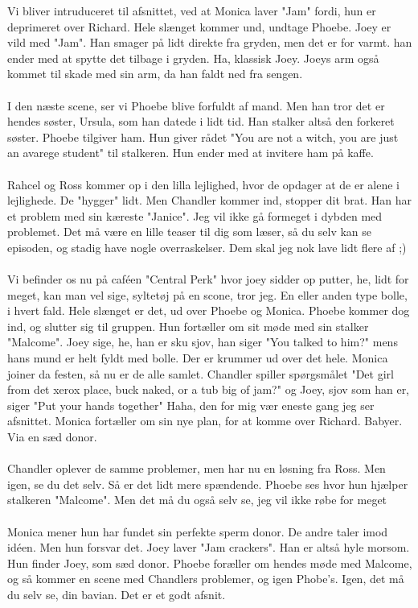 \documentclass[]{article}
\begin{document}
Vi bliver intruduceret til afsnittet, ved at Monica laver "Jam" fordi, hun er deprimeret over Richard. Hele slænget kommer und, undtage Phoebe. Joey er vild med "Jam". Han smager på lidt direkte fra gryden, men det er for varmt. han ender med at spytte det tilbage i gryden. Ha, klassisk Joey. Joeys arm også kommet til skade med sin arm, da han faldt ned fra sengen. 
\\ \\
I den næste scene, ser vi Phoebe blive forfuldt af mand. Men han tror det er hendes søster, Ursula, som han datede i lidt tid. Han stalker altså den forkeret søster. Phoebe tilgiver ham. Hun giver rådet "You are not a witch, you are just an avarege student" til stalkeren. Hun ender med at invitere ham på kaffe.
\\ \\
Rahcel og Ross kommer op i den lilla lejlighed, hvor de opdager at de er alene i lejlighede. De "hygger" lidt. Men Chandler kommer ind, stopper dit brat. Han har et problem med sin kæreste "Janice". Jeg vil ikke gå formeget i dybden med problemet. Det må være en lille teaser til dig som læser, så du selv kan se episoden, og stadig have nogle overraskelser. Dem skal jeg nok lave lidt flere af ;)
\\ \\
Vi befinder os nu på caféen "Central Perk" hvor joey sidder op putter, he, lidt for meget, kan man vel sige, syltetøj på en scone, tror jeg. En eller anden type bolle, i hvert fald. Hele slænget er det, ud over Phoebe og Monica. Phoebe kommer dog ind, og slutter sig til gruppen. Hun fortæller om sit møde med sin stalker "Malcome". Joey sige, he, han er sku sjov, han siger "You talked to him?" mens hans mund er helt fyldt med bolle. Der er krummer ud over det hele. Monica joiner da festen, så nu er de alle samlet. Chandler spiller spørgsmålet "Det girl from det xerox place, buck naked, or a tub big of jam?" og Joey, sjov som han er, siger "Put your hands together" Haha, den for mig vær eneste gang jeg ser afsnittet. Monica fortæller om sin nye plan, for at komme over Richard. Babyer. Via en sæd donor.
\\ \\
Chandler oplever de samme problemer, men har nu en løsning fra Ross. Men igen, se du det selv. Så er det lidt mere spændende. Phoebe ses hvor hun hjælper stalkeren "Malcome". Men det må du også selv se, jeg vil ikke røbe for meget
\\ \\
Monica mener hun har fundet sin perfekte sperm donor. De andre taler imod idéen. Men hun forsvar det. Joey laver "Jam crackers". Han er altså hyle morsom. Hun finder Joey, som sæd donor. Phoebe foræller om hendes møde med Malcome, og så kommer en scene med Chandlers problemer, og igen Phobe's. Igen, det må du selv se, din bavian. Det er et godt afsnit.
\end{document}
